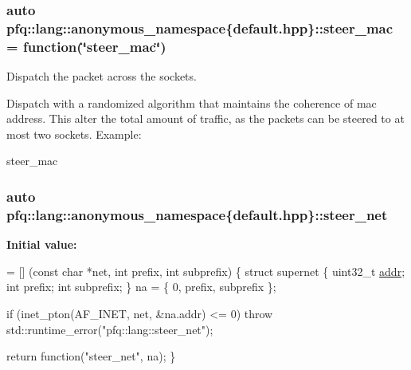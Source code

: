 \subsubsection[{\texorpdfstring{steer\+\_\+mac}{steer_mac}}]{\setlength{\rightskip}{0pt plus 5cm}auto pfq\+::lang\+::anonymous\+\_\+namespace\{default.\+hpp\}\+::steer\+\_\+mac = {\bf function}(\char`\"{}steer\+\_\+mac\char`\"{})}\hypertarget{namespacepfq_1_1lang_1_1anonymous__namespace_02default_8hpp_03_ad51e91e3b485c729ac1ba39a46e337a0}{}\label{namespacepfq_1_1lang_1_1anonymous__namespace_02default_8hpp_03_ad51e91e3b485c729ac1ba39a46e337a0}


Dispatch the packet across the sockets. 

Dispatch with a randomized algorithm that maintains the coherence of mac address. This alter the total amount of traffic, as the packets can be steered to at most two sockets. Example\+:

steer\+\_\+mac 
\subsubsection[{\texorpdfstring{steer\+\_\+net}{steer_net}}]{\setlength{\rightskip}{0pt plus 5cm}auto pfq\+::lang\+::anonymous\+\_\+namespace\{default.\+hpp\}\+::steer\+\_\+net}\hypertarget{namespacepfq_1_1lang_1_1anonymous__namespace_02default_8hpp_03_a6f8d514e40bb2b0e874fb26d2b416dc3}{}\label{namespacepfq_1_1lang_1_1anonymous__namespace_02default_8hpp_03_a6f8d514e40bb2b0e874fb26d2b416dc3}
{\bfseries Initial value\+:}
\begin{DoxyCode}
= [] (\textcolor{keyword}{const} \textcolor{keywordtype}{char} *net, \textcolor{keywordtype}{int} prefix, \textcolor{keywordtype}{int} subprefix)
        \{
            \textcolor{keyword}{struct }supernet \{
                uint32\_t \hyperlink{namespacepfq_1_1lang_1_1anonymous__namespace_02default_8hpp_03_a13cabe468839119d8d68540e3c60718b}{addr};
                \textcolor{keywordtype}{int}      prefix;
                \textcolor{keywordtype}{int}      subprefix;
            \} na = \{ 0, prefix, subprefix \};

            \textcolor{keywordflow}{if} (inet\_pton(AF\_INET, net, &na.addr) <= 0)
                \textcolor{keywordflow}{throw} std::runtime\_error(\textcolor{stringliteral}{"pfq::lang::steer\_net"});

            \textcolor{keywordflow}{return} \textcolor{keyword}{function}(\textcolor{stringliteral}{"steer\_net"}, na);
        \}
\end{DoxyCode}


